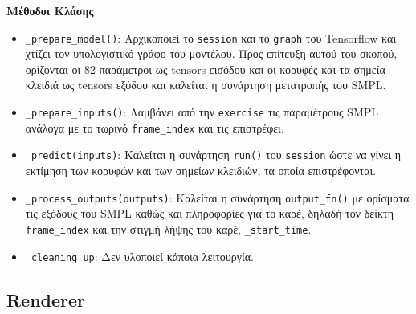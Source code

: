 \noindent\textbf{Μέθοδοι Κλάσης}

\begin{itemize}
	\item \texttt{\_prepare\_model()}: Αρχικοποιεί το \texttt{session} και το \texttt{graph} του Tensorflow και χτίζει τον υπολογιστικό γράφο του μοντέλου. Προς επίτευξη αυτού του σκοπού, ορίζονται οι 82 παράμετροι ως tensors εισόδου και οι κορυφές και τα σημεία κλειδιά ως tensors εξόδου και καλείται η συνάρτηση μετατροπής του SMPL.
	\item \texttt{\_prepare\_inputs()}: Λαμβάνει από την \texttt{exercise} τις παραμέτρους SMPL ανάλογα με το τωρινό \texttt{frame\_index} και τις επιστρέφει.
	\item \texttt{\_predict(inputs)}: Καλείται η συνάρτηση \texttt{run()} του \texttt{session} ώστε να γίνει η εκτίμηση των κορυφών και των σημείων κλειδιών, τα οποία επιστρέφονται.
	\item \texttt{\_process\_outputs(outputs)}: Καλείται η συνάρτηση \texttt{output\_fn()} με ορίσματα τις εξόδους του SMPL καθώς και πληροφορίες για το καρέ, δηλαδή τον δείκτη \texttt{frame\_index} και την στιγμή λήψης του καρέ, \texttt{\_start\_time}.
	\item \texttt{\_cleaning\_up}: Δεν υλοποιεί κάποια λειτουργία.
\end{itemize}

\newpage

\subsection{Renderer}
\label{sec:renderer}

